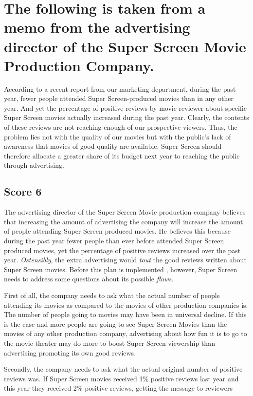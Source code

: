 \chapter{The following is taken from a memo from the advertising director of the Super Screen Movie Production Company.}

According to a recent report from our marketing department, during the past year, fewer people attended Super Screen-produced movies than in any other year.
And yet the percentage of positive reviews by movie reviewer about specific Super Screen movies actually increased during the past year.
Clearly, the contents of these reviews are not reaching enough of our prospective viewers.
Thus, the problem lies not with the quality of our movies but with the public's lack of awareness that movies of good quality are available.
Super Screen should therefore allocate a greater share of its budget next year to reaching the public through advertising.

\section{Score 6}
The advertising director of the Super Screen Movie production company believes that increasing the amount of advertising the company will increase the amount of people attending Super Screen produced movies.
He believes this because during the past year fewer people than ever before attended Super Screen produced movies, yet the percentage of positive reviews increased over the past year.
\emph{Ostensibly}, the extra advertising would \emph{tout} the good reviews written about Super Screen movies.
Before this plan is implemented , however, Super Screen needs to address some questions about its possible \emph{flaws}.

First of all, the company needs to ask what the actual number of people attending its movies as compared to the movies of other production companies is.
The number of people going to movies may have been in universal decline.
If this is the case and more people are going to see Super Screen Movies than the movies of any other production company, advertising about how fun it is to go to the movie theater may do more to boost Super Screen viewership than advertising promoting its own good reviews.

Secondly, the company needs to ask what the actual original number of positive reviews was.
If Super Screen movies received 1\% positive reviews last year and this year they received 2\% positive reviews, getting the message to reviewers 